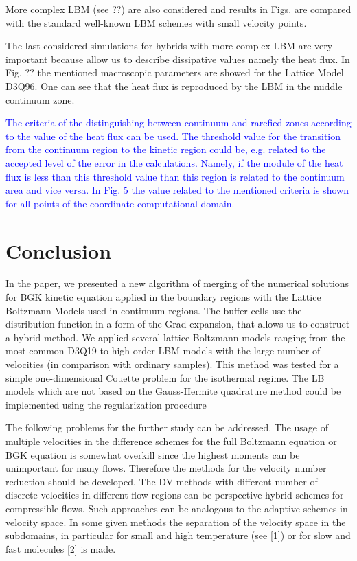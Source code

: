 \documentclass[]{elsarticle} %
\begin{document}
{More complex LBM (see ??)  are also considered and results in Figs.  are compared with the standard  well-known LBM schemes with small velocity points.

The last considered simulations for hybrids with more complex LBM are very important because allow us to describe dissipative values namely the heat flux. In Fig. ?? the mentioned macroscopic parameters are showed for the Lattice Model D3Q96. One can see that the heat flux is reproduced by the LBM in the middle continuum zone.

\textcolor{blue} {The criteria of the distinguishing between continuum and rarefied zones according to the value of the heat flux can be used. The threshold value for the transition from the continuum region to the kinetic region could be, e.g. related to the accepted level of the error in the calculations. Namely, if the module of the heat flux is less than this threshold value than this region is related to the continuum area and vice versa. In Fig. 5 the value related to the mentioned criteria is shown for all points of the coordinate computational domain.}

\section{Conclusion}\label{sec:summary}

In the paper, we presented a new algorithm of merging of the numerical solutions for BGK kinetic equation applied in the boundary regions with the Lattice Boltzmann Models used in continuum regions. The buffer cells use the distribution function in a form of the Grad expansion, that allows us to construct a hybrid method. We applied several lattice Boltzmann models ranging from the most common D3Q19 to high-order LBM models with the large number of velocities (in comparison with ordinary samples). This method was tested for a simple one-dimensional Couette problem for the isothermal regime.  The  LB
models  which are not based on the Gauss-Hermite quadrature  method could be implemented  using the regularization procedure

The following problems for the further study can be addressed. The usage of multiple velocities in the difference schemes for the full Boltzmann equation or BGK equation is somewhat overkill since the highest moments can be unimportant for many flows. Therefore the methods for the velocity number reduction  should be developed. The DV methods with different  number of discrete velocities in different flow regions can be perspective hybrid schemes for compressible flows. Such approaches can be analogous to the adaptive schemes in velocity space. In some given methods the separation of the velocity space in the subdomains, in particular for small and high temperature (see [1]) or for slow and fast molecules [2] is made.

}
\end{document}
